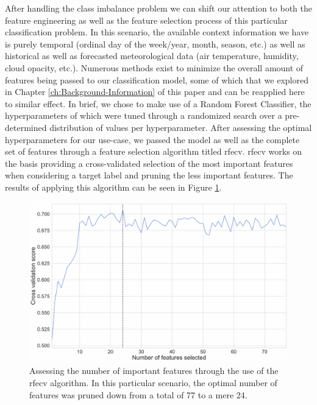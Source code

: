 \noindent \newline After handling the class imbalance problem we can shift our attention to both the feature engineering as well as the feature selection process of this particular classification problem. In this scenario, the available context information we have is purely temporal (ordinal day of the week/year, month, season, etc.) as well as historical as well as forecasted meteorological data (air temperature, humidity, cloud opacity, etc.). Numerous methods exist to minimize the overall amount of features being passed to our classification model, some of which that we explored in Chapter \ref{ch:Background-Information} of this paper and can be reapplied here to similar effect. In brief, we chose to make use of a Random Forest Classifier, the hyperparameters of which were tuned through a randomized search over a pre-determined distribution of values per hyperparameter. After assessing the optimal hyperparameters for our use-case, we passed the model as well as the complete set of features through a feature selection algorithm titled \gls{rfecv}. \gls{rfecv} works on the basis providing a cross-validated selection of the most important features when considering a target label and pruning the less important features. The results of applying this algorithm can be seen in Figure \ref{fig:UCID-RFECV}.

\begin{figure}[H]
    \centering
    \includegraphics[width=\textwidth]{Images/Chapter 6/Stage 4/UCID/UCID-RFECV.pdf}
    \caption{Assessing the number of important features through the use of the \gls{rfecv} algorithm. In this particular scenario, the optimal number of features was pruned down from a total of 77 to a mere 24.}
    \label{fig:UCID-RFECV}
\end{figure}

